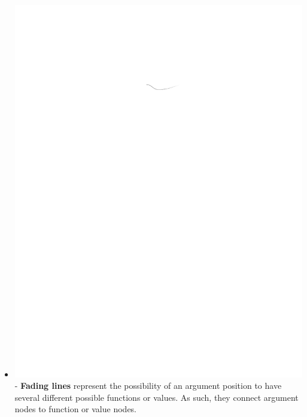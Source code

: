\documentclass[conference]{IEEEtran}
\begin{document}
\begin{itemize}
		\item  \vspace{.25cm} \includegraphics{glossary-fadingline} - \textbf{Fading lines} represent
		the possibility of an argument position to have several different possible
		functions or values. As such, they connect argument nodes to function or value
		nodes.
		

\end{itemize}
\end{document}
